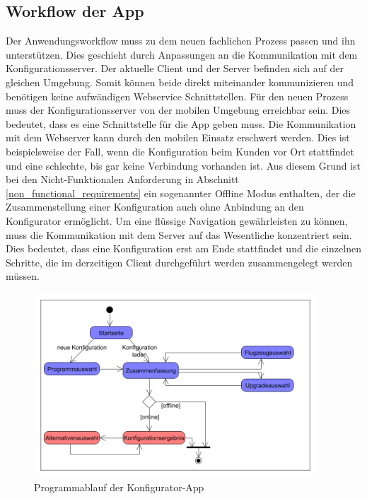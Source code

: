 \subsection{Workflow der App}
Der Anwendungsworkflow muss zu dem neuen fachlichen Prozess passen und ihn unterstützen. Dies geschieht durch Anpassungen an die Kommunikation mit dem Konfigurationsserver. 
Der aktuelle Client und der Server befinden sich auf der gleichen Umgebung. Somit können beide direkt miteinander kommunizieren und benötigen keine aufwändigen Webservice Schnittstellen. Für den neuen Prozess muss der Konfigurationsserver von der mobilen Umgebung erreichbar sein. Dies bedeutet, dass es eine Schnittstelle für die App geben muss. Die Kommunikation mit dem Webserver kann durch den mobilen Einsatz erschwert werden. Dies ist beispielsweise der Fall, wenn die Konfiguration beim Kunden vor Ort stattfindet und eine schlechte, bis gar keine Verbindung vorhanden ist. Aus diesem Grund ist bei den Nicht-Funktionalen Anforderung in Abschnitt \ref{non_functional_requirements} ein sogenannter Offline Modus enthalten, der die Zusammenstellung einer Konfiguration auch ohne Anbindung an den Konfigurator ermöglicht. Um eine flüssige Navigation gewährleisten zu können, muss die Kommunikation mit dem Server auf das Wesentliche konzentriert sein. Dies bedeutet, dass eine Konfiguration erst am Ende stattfindet und die einzelnen Schritte, die im derzeitigen Client durchgeführt werden zusammengelegt werden müssen. \par
\begin{figure}
\label{appWorkflow}
\centering
\includegraphics[width=400px]{images/workflow_app}
\caption{Programmablauf der Konfigurator-App}
\end{figure}
